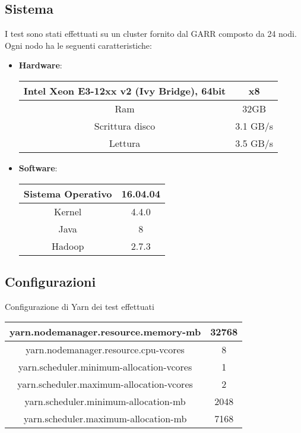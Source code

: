\subsection{Sistema}
I test sono stati effettuati su un cluster fornito dal GARR composto da 24 nodi.\\
Ogni nodo ha le seguenti caratteristiche:\\
\begin{itemize}
\item \textbf{Hardware}:\\

\begin{center}
\begin{tabular}{ | c | c |} 
\hline
Intel Xeon E3-12xx v2 (Ivy Bridge), 64bit & x8 \\ 
\hline
Ram & 32GB \\ 
\hline
Scrittura disco & 3.1 GB/s \\
\hline
Lettura & 3.5 GB/s \\ 
\hline
\end{tabular}
\end{center}

\item \textbf{Software}:\\

\begin{center}
\begin{tabular}{ | c | c |} 
\hline
Sistema Operativo & 16.04.04 \\ 
\hline
Kernel & 4.4.0 \\ 
\hline
Java & 8 \\
\hline
Hadoop & 2.7.3 \\ 
\hline
\end{tabular}
\end{center}
\end{itemize}

\subsection{Configurazioni}
Configurazione di Yarn dei test effettuati

\begin{center}
\begin{tabular}{ | c | c |} 
\hline
yarn.nodemanager.resource.memory-mb & 32768 \\ 
\hline
yarn.nodemanager.resource.cpu-vcores & 8 \\ 
\hline
yarn.scheduler.minimum-allocation-vcores & 1 \\
\hline
yarn.scheduler.maximum-allocation-vcores & 2 \\ 
\hline
yarn.scheduler.minimum-allocation-mb & 2048 \\
\hline
yarn.scheduler.maximum-allocation-mb & 7168 \\
\hline
\end{tabular}
\end{center}

